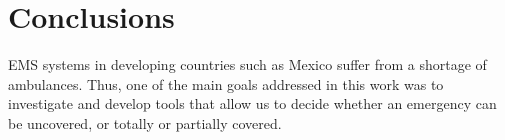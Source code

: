 %


\chapter{Conclusions}\label{cap:concl}


EMS systems in developing countries such as Mexico suffer from a shortage of ambulances. Thus, one of the main goals addressed in this work was
to investigate and develop tools that allow us to decide
whether an emergency can be uncovered, or totally or partially covered.    

